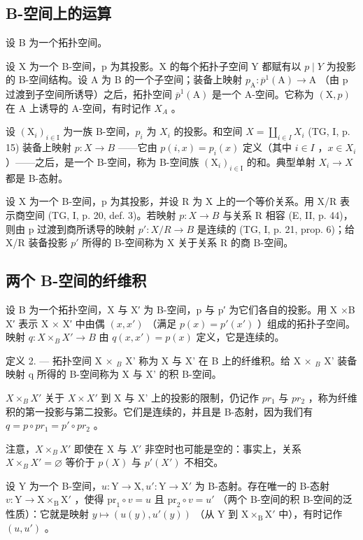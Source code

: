 \subsection{B-空间上的运算}

设 B 为一个拓扑空间。

设 X 为一个 B-空间，p 为其投影。X 的每个拓扑子空间 Y 都赋有以 \(p \mid Y\) 为投影的 B-空间结构。设 A 为 B 的一个子空间；装备上映射 \(p_{\mathrm{A}}: \overline{p}^{1}(\mathrm{A}) \to \mathrm{A}\) （由 p 过渡到子空间所诱导）之后，拓扑空间 \(\overline{p}^{1}(\mathrm{A})\) 是一个 A-空间。它称为 \((\mathrm{X}, p)\) 在 A 上诱导的 A-空间，有时记作 \(X_{A}\) 。

设 \((\mathrm{X}_{i})_{i\in\mathrm{I}}\) 为一族 B-空间，\(p_{i}\) 为 \(X_{i}\) 的投影。和空间 \(X = \coprod_{i\in I} X_{i}\) (TG, I, p. 15) 装备上映射 \(p: X \to B\) ——它由 \(p(i,x) = p_{i}(x)\) 定义（其中 \(i \in I\) ，\(x \in X_{i}\) ）——之后，是一个 B-空间，称为 B-空间族 \((\mathrm{X}_{i})_{i\in\mathrm{I}}\) 的和。典型单射 \(X_{i} \to X\) 都是 B-态射。

设 X 为一个 B-空间，p 为其投影，并设 R 为 X 上的一个等价关系。用 X/R 表示商空间 (TG, I, p. 20, def. 3)。若映射 \(p: X \rightarrow B\) 与关系 R 相容 (E, II, p. 44)，则由 p 过渡到商所诱导的映射 \(p'\colon X/R \to B\) 是连续的 (TG, I, p. 21, prop. 6)；给 X/R 装备投影 \(p'\) 所得的 B-空间称为 X 关于关系 R 的商 B-空间。

\subsection{两个 B-空间的纤维积}

设 B 为一个拓扑空间，X 与 X′ 为 B-空间，p 与 p′ 为它们各自的投影。用 X ×B X′ 表示 X × X′ 中由偶 \((x, x')\) （满足 \(p(x) = p'(x')\) ）组成的拓扑子空间。映射 \(q: X \times_{B} X' \to B\) 由 \(q(x, x') = p(x)\) 定义，它是连续的。

定义 2. --- 拓扑空间 X × \(_{B}\) X' 称为 X 与 X' 在 B 上的纤维积。给 X × \(_{B}\) X' 装备映射 q 所得的 B-空间称为 X 与 X' 的积 B-空间。

\(X \times_{B} X'\) 关于 \(X \times X'\) 到 X 与 X' 上的投影的限制，仍记作 \(pr_{1}\) 与 \(pr_{2}\) ，称为纤维积的第一投影与第二投影。它们是连续的，并且是 B-态射，因为我们有 \(q = p \circ pr_{1} = p' \circ pr_{2}\) 。

注意，\(X \times_{B} X'\) 即使在 X 与 \(X'\) 非空时也可能是空的：事实上，关系 \(X \times_{B} X' = \varnothing\) 等价于 \(p(X)\) 与 \(p'(X')\) 不相交。

设 Y 为一个 B-空间，\(u\colon\mathrm{Y}\to\mathrm{X}, u'\colon\mathrm{Y}\to\mathrm{X}'\) 为 B-态射。存在唯一的 B-态射 \(v\colon\mathrm{Y}\to\mathrm{X}\times_{\mathrm{B}}\mathrm{X}'\) ，使得 \(\mathrm{pr}_{1}\circ v=u\) 且 \(\mathrm{pr}_{2}\circ v=u'\) （两个 B-空间的积 B-空间的泛性质）：它就是映射 \(y\mapsto(u(y),u'(y))\) （从 Y 到 \(\mathrm{X}\times_{\mathrm{B}}\mathrm{X}'\) 中），有时记作 \((u,u')\) 。

